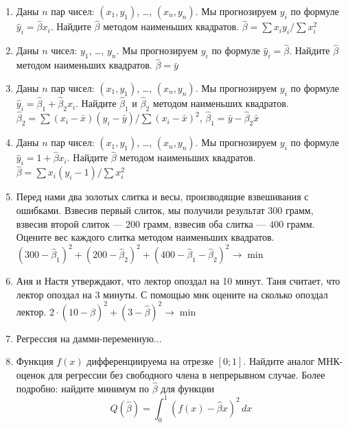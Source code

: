 \documentclass[pdftex,12pt,a4paper]{article}
\def \hb{\hat{\beta}}
\def \hy{\hat{y}}
\newcommand{\solution}[1]{ {\tiny #1} }
\newcommand{\problem}[1]{#1}
\begin{document}
\begin{enumerate}
\item \problem{Даны $n$ пар чисел: $(x_1, y_1)$, \ldots, $(x_n,y_n)$. Мы прогнозируем $y_i$ по формуле $\hy_i=\hb x_i$. Найдите $\hb$ методом наименьших квадратов. }
\solution{$\hb=\sum x_i y_i/\sum x_i^2$}

\item \problem{Даны $n$ чисел: $y_1$, \ldots, $y_n$. Мы прогнозируем $y_i$ по формуле $\hy_i=\hb$. Найдите $\hb$ методом наименьших квадратов. }
\solution{$\hb=\bar{y}$}

\item \problem{Даны $n$ пар чисел: $(x_1, y_1)$, \ldots, $(x_n,y_n)$. Мы прогнозируем $y_i$ по формуле $\hy_i=\hb_1+\hb_2 x_i$. Найдите $\hb_1$ и $\hb_2$ методом наименьших квадратов. }
\solution{$\hb_2=\sum (x_i-\bar{x})(y_i-\bar{y})/\sum(x_i-\bar{x})^2$, $\hb_1=\bar{y}-\hb_2\bar{x}$}

\item \problem{Даны $n$ пар чисел: $(x_1, y_1)$, \ldots, $(x_n,y_n)$. Мы прогнозируем $y_i$ по формуле $\hy_i=1+\hb x_i$. Найдите $\hb$ методом наименьших квадратов. }
\solution{$\hb=\sum x_i (y_i-1)/\sum x_i^2$}

\item \problem{ Перед нами два золотых слитка и весы, производящие взвешивания с ошибками. Взвесив первый слиток, мы получили результат $300$ грамм, взвесив второй слиток --- $200$ грамм, взвесив оба слитка --- $400$ грамм. Оцените вес каждого слитка методом наименьших квадратов.}
\solution{ $(300-\hb_1)^2+(200-\hb_2)^2+(400-\hb_1-\hb_2)^2\to\min$ }


\item Аня и Настя утверждают, что лектор опоздал на 10 минут. Таня считает, что лектор опоздал на 3 минуты. С помощью мнк оцените на сколько опоздал лектор. 
\solution{ $2\cdot (10-\hb)^2+(3-\hb)^2\to\min$ }

\item Регрессия на дамми-переменную...



\item Функция $f(x)$ дифференциируема на отрезке $[0;1]$. Найдите аналог МНК-оценок для регрессии без свободного члена в непрерывном случае. Более подробно: найдите минимум по $\hb$ для функции
\begin{equation}
Q(\hb)= \int_0^1 (f(x)-\hb x)^2\,dx
\end{equation}
\solution{}


\end{enumerate}
\end{document}
